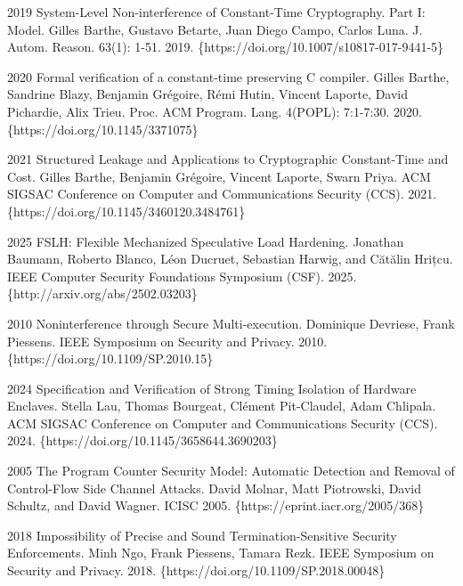 \documentclass[12pt]{report}
\begin{document}
   2019 System-Level Non-interference of Constant-Time
  Cryptography. Part I: Model. Gilles Barthe, Gustavo Betarte, Juan Diego Campo,
  Carlos Luna. J. Autom. Reason. 63(1): 1-51. 2019.
  \{https://doi.org/10.1007/s10817-017-9441-5\}


   2020 Formal verification of a constant-time preserving C
  compiler. Gilles Barthe, Sandrine Blazy, Benjamin Grégoire, Rémi Hutin,
  Vincent Laporte, David Pichardie, Alix Trieu. Proc. ACM
  Program. Lang. 4(POPL): 7:1-7:30. 2020. \{https://doi.org/10.1145/3371075\}


   2021 Structured Leakage and Applications to Cryptographic
  Constant-Time and Cost. Gilles Barthe, Benjamin Grégoire, Vincent Laporte,
  Swarn Priya. ACM SIGSAC Conference on Computer and Communications Security
  (CCS). 2021. \{https://doi.org/10.1145/3460120.3484761\}


   2025 FSLH: Flexible Mechanized Speculative Load
  Hardening. Jonathan Baumann, Roberto Blanco, Léon Ducruet, Sebastian Harwig,
  and Cătălin Hrițcu. IEEE Computer Security Foundations Symposium
  (CSF). 2025. \{http://arxiv.org/abs/2502.03203\}


   2010 Noninterference through Secure
  Multi-execution. Dominique Devriese, Frank Piessens. IEEE Symposium on
  Security and Privacy. 2010.  \{https://doi.org/10.1109/SP.2010.15\}


   2024 Specification and Verification of Strong Timing Isolation
  of Hardware Enclaves. Stella Lau, Thomas Bourgeat, Clément Pit-Claudel, Adam
  Chlipala. ACM SIGSAC Conference on Computer and Communications Security
  (CCS). 2024. \{https://doi.org/10.1145/3658644.3690203\}


   2005 The Program Counter Security Model: Automatic Detection
  and Removal of Control-Flow Side Channel Attacks. David Molnar, Matt
  Piotrowski, David Schultz, and David Wagner. ICISC 2005.
  \{https://eprint.iacr.org/2005/368\}


   2018 Impossibility of Precise and Sound Termination-Sensitive
  Security Enforcements. Minh Ngo, Frank Piessens, Tamara Rezk. IEEE Symposium
  on Security and Privacy. 2018. \{https://doi.org/10.1109/SP.2018.00048\}
\end{document}
